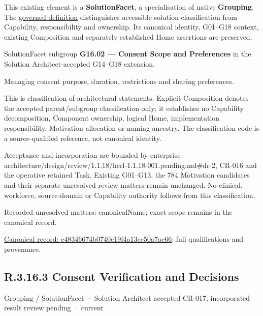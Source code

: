 This existing element is a \textbf{SolutionFacet}, a specialisation of native
\textbf{Grouping}. The \href{\detokenize{../../../../../../../governance/continuum-representation.md#solutionfacet-classification--1119-candidate}}{governed definition}
distinguishes accessible solution classification from Capability, responsibility
and ownership. Its canonical identity, G01–G18 context, existing Composition
and separately established Home assertions are preserved.



SolutionFacet subgroup \textbf{G16.02 — Consent Scope and Preferences} in the Solution Architect-accepted G14–G18 extension.



Managing consent purpose, duration, restrictions and sharing preferences.



This is classification of architectural statements. Explicit Composition denotes the accepted parent/subgroup classification only; it establishes no Capability decomposition, Component ownership, logical Home, implementation responsibility, Motivation allocation or naming ancestry. The classification code is a source-qualified reference, not canonical identity.



Acceptance and incorporation are bounded by enterprise-architecture/design/review/1.1.18/hcrl-1.1.18-001.pending.md\#dr-2, CR-016 and the operative retained Task. Existing G01–G13, the 784 Motivation candidates and their separate unresolved review matters remain unchanged. No clinical, workforce, source-domain or Capability authority follows from this classification.


{\small Recorded unresolved matters: canonicalName; exact scope remains in the canonical record.}\par
{\footnotesize \href{../../../../../../../continuum/grouping/e48346674b0740c19f4a13cc50a7ae66.md}{Canonical record: e48346674b0740c19f4a13cc50a7ae66}; full qualifications and provenance.}\par
\subsection*{R.3.16.3 Consent Verification and Decisions}
\label{navigation:R.3.16.3}

\label{element:3d87dbf35e0a43a3b5e12cbc6b947763}
{\small Grouping / SolutionFacet · Solution Architect accepted CR-017; incorporated-result review pending · current}\par

